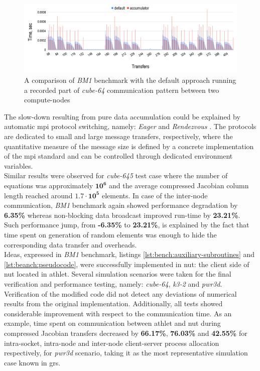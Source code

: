 \begin{figure}[htpb]
  \centering
  \includegraphics[width=1.0\textwidth]{figures/chapter-3/benchmark-result-non-blocking-inter-node-comm.png}
  \caption{A comparison of \textit{BM1} benchmark with the default approach running a recorded part of \textit{cube-64} communication pattern between two compute-nodes}
\label{fig:benchmark:results-cube-64-inter-node-comm}
\end{figure}


The slow-down resulting from pure data accumulation could be explained by automatic \gls{mpi} protocol switching, namely: \textit{Eager} and \textit{Rendezvous} \cite{mpi:protocols-explanation}. The protocols are dedicated to small and large message transfers, respectively, where the quantitative measure of the message size is defined by a concrete implementation of the \gls{mpi} standard and can be controlled through dedicated environment variables.\\



Similar results were observed for \textit{cube-645} test case where the number of equations was approximately $\bm{10^6}$ and the average compressed Jacobian column length reached around $\bm{1.7 \cdot 10^5}$ elements. In case of the inter-node communication, \textit{BM1} benchmark again showed performance degradation by \textbf{6.35\%} whereas non-blocking data broadcast improved run-time by \textbf{23.21\%}. Such performance jump, from \textbf{-6.35\%} to \textbf{23.21\%}, is explained by the fact that time spent on generation of random elements was enough to hide the corresponding data transfer and overheads.\\



Ideas, expressed in \textit{BM1} benchmark, listings \ref{lst:bench:auxiliary-subroutines} and \ref{lst:beanch:pseudocode}, were successfully implemented in \gls{nut}: the client side of \gls{nut} located in \gls{athlet}. Several simulation scenarios were taken for the final verification and performance testing, namely: \textit{cube-64}, \textit{k3-2} and \textit{pwr3d}. Verification of the modified code did not detect any deviations of numerical results from the original implementation. Additionally, all tests showed considerable improvement with respect to the communication time. As an example, time spent on communication between \gls{athlet} and \gls{nut} during compressed Jacobian transfers decreased by \textbf{66.17\%}, \textbf{76.03\%} and \textbf{42.55\%} for intra-socket, intra-node and inter-node client-server process allocation respectively, for \textit{pwr3d} scenario, taking it as the most representative simulation case known in \gls{grs}.\\


